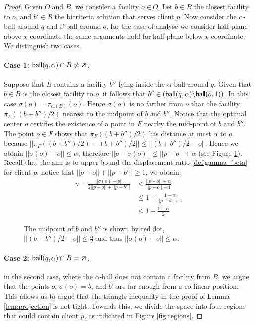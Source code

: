 \documentclass[11pt]{article}
\newcommand{\ball}{{\sf ball}}
\begin{document}
\begin{proof}
Given $O$ and $B$, we consider a facility $o \in O$. Let $b\in B$  the closest facility to $o$, and $b'\in B$  the bicriteria solution that serves client $p$.  Now consider the $\alpha$-ball around $q$ and $\beta$-ball around $o$, for the ease of analyse we consider half plane above $x$-coordinate the same arguments hold for half plane below $x$-coordinate. We distinguish two cases.

\paragraph*{Case 1: $\ball(q, \alpha) \cap B \neq \varnothing$.} Suppose that $B$ contains a facility $b''$ lying inside the $\alpha$-ball around $q$.  Given that  $b\in B$ is the closest facility to $o$, it follows that $b''\in(\ball(q,\alpha)\backslash \ball(o, 1))$. In this case $\sigma(o)=\pi_{\text{cl}(B)}(o)$. Hence $\sigma(o)$ is no farther from $o$ than the facility $\pi_F((b+b'')/2)$ nearest to the midpoint of $b$ and $b''$.  Notice that the optimal center $o$ certifies the existence of a point in $F$ nearby the mid-point of $b$ and $b''$. The point $o\in F$ shows that $\pi_{F}((b+b'')/2)$ has distance at most $\alpha$ to $o$ because $||\pi_{F}((b+b'')/2)-(b+b'')/2||\leq ||(b+b'')/2-o||$. Hence we obtain $||\sigma(o)-o|| \leq \alpha$, therefore $ ||p-\sigma(o)|| \leq ||p-o||+ \alpha$ (see Figure \ref{fig:case1M}). Recall that the aim is to upper bound the displacement ratio \ref{def:gamma_beta} for client $p$, notice that $||p-o||+||p-b'|| \geq 1$, we obtain:
\begin{equation*}
     \begin{split}
     \gamma=\frac{||\sigma(o)-p||}{2||p-o|| + ||p-b'||} & \leq \frac{||p-o||+\alpha}{||p-o||+1}\\
     &\leq 1 - \frac{1-\alpha}{||p-o||+1}\\
     &\leq 1- \frac{1-\alpha}{2}
     \end{split}
\end{equation*}     

\begin{figure}[h]

     \centering
     \tikzV
      \caption{\footnotesize The midpoint of $b$ and $b''$ is shown by red dot, $||(b+b'')/2 - o || \leq \frac{\alpha}{2}$ and thus $||\sigma(o)-o||\leq\alpha$.}
        \label{fig:case1M}
\end{figure}    
\paragraph*{Case 2: $\ball(q, \alpha) \cap B = \varnothing$.} in the second case, where the $\alpha$-ball does not contain a facility from $B$, we argue that the points $o$, $\sigma(o) = b$, and $b'$ are far enough from a co-linear position. This allows us to argue that the triangle inequality in the proof of Lemma \ref{lem:projection} is not tight. Towards this, we divide the space into four regions that could contain client $p$, as indicated in Figure \ref{fig:regions}.


\end{proof}
\end{document}
